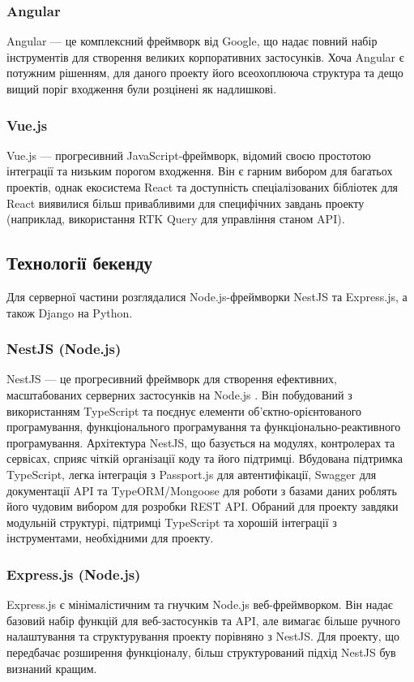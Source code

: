 \subsubsection{Angular}
Angular — це комплексний фреймворк від Google, що надає повний набір інструментів для створення великих корпоративних застосунків. Хоча Angular є потужним рішенням, для даного проекту його всеохоплююча структура та дещо вищий поріг входження були розцінені як надлишкові.

\subsubsection{Vue.js}
Vue.js — прогресивний JavaScript-фреймворк, відомий своєю простотою інтеграції та низьким порогом входження. Він є гарним вибором для багатьох проектів, однак екосистема React та доступність спеціалізованих бібліотек для React виявилися більш привабливими для специфічних завдань проекту (наприклад, використання RTK Query для управління станом API).

\subsection{Технології бекенду}
Для серверної частини розглядалися Node.js-фреймворки NestJS та Express.js, а також Django на Python.
\subsubsection{NestJS (Node.js)}
NestJS — це прогресивний фреймворк для створення ефективних, масштабованих серверних застосунків на Node.js \cite{nestjs}. Він побудований з використанням TypeScript та поєднує елементи об'єктно-орієнтованого програмування, функціонального програмування та функціонально-реактивного програмування. Архітектура NestJS, що базується на модулях, контролерах та сервісах, сприяє чіткій організації коду та його підтримці. Вбудована підтримка TypeScript, легка інтеграція з Passport.js для автентифікації, Swagger для документації API та TypeORM/Mongoose для роботи з базами даних роблять його чудовим вибором для розробки REST API. Обраний для проекту завдяки модульній структурі, підтримці TypeScript та хорошій інтеграції з інструментами, необхідними для проекту.

\subsubsection{Express.js (Node.js)}
Express.js є мінімалістичним та гнучким Node.js веб-фреймворком. Він надає базовий набір функцій для веб-застосунків та API, але вимагає більше ручного налаштування та структурування проекту порівняно з NestJS. Для проекту, що передбачає розширення функціоналу, більш структурований підхід NestJS був визнаний кращим.

